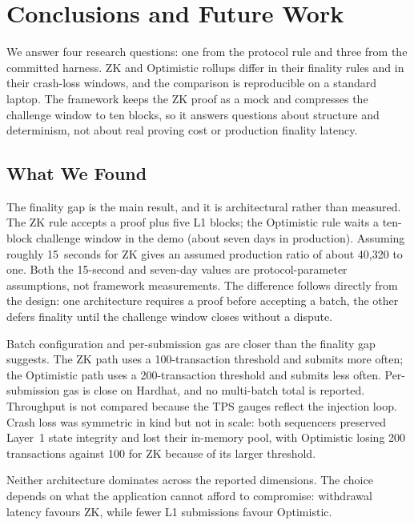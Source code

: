 \chapter{Conclusions and Future Work}
\label{ch:conclusion}

We answer four research questions: one from the protocol rule and three from the committed harness. ZK and Optimistic rollups differ in their finality rules and in their crash-loss windows, and the comparison is reproducible on a standard laptop. The framework keeps the ZK proof as a mock and compresses the challenge window to ten blocks, so it answers questions about structure and determinism, not about real proving cost or production finality latency.

\section{What We Found}

The finality gap is the main result, and it is architectural rather than measured. The ZK rule accepts a proof plus five L1 blocks; the Optimistic rule waits a ten-block challenge window in the demo (about seven days in production). Assuming roughly 15~seconds for ZK gives an assumed production ratio of about 40,320 to one. Both the 15-second and seven-day values are protocol-parameter assumptions, not framework measurements. The difference follows directly from the design: one architecture requires a proof before accepting a batch, the other defers finality until the challenge window closes without a dispute.

Batch configuration and per-submission gas are closer than the finality gap suggests. The ZK path uses a 100-transaction threshold and submits more often; the Optimistic path uses a 200-transaction threshold and submits less often. Per-submission gas is close on Hardhat, and no multi-batch total is reported. Throughput is not compared because the TPS gauges reflect the injection loop. Crash loss was symmetric in kind but not in scale: both sequencers preserved Layer~1 state integrity and lost their in-memory pool, with Optimistic losing 200 transactions against 100 for ZK because of its larger threshold.

Neither architecture dominates across the reported dimensions. The choice depends on what the application cannot afford to compromise: withdrawal latency favours ZK, while fewer L1 submissions favour Optimistic.

